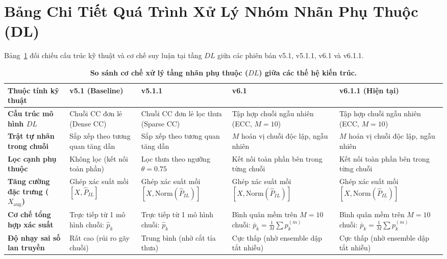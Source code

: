 \documentclass[11pt,a4paper]{article}
\begin{document}
\section{Bảng Chi Tiết Quá Trình Xử Lý Nhóm Nhãn Phụ Thuộc (DL)}

Bảng~\ref{tab:dl_processing_comparison} đối chiếu cấu trúc kỹ thuật và cơ chế suy luận tại tầng $DL$ giữa các phiên bản v5.1, v5.1.1, v6.1 và v6.1.1.

\begin{table}[H]
\centering
\small
\caption{\textbf{So sánh cơ chế xử lý tầng nhãn phụ thuộc ($DL$) giữa các thế hệ kiến trúc.}}
\label{tab:dl_processing_comparison}
\begin{tabular}{p{3.2cm} p{3.2cm} p{3.2cm} p{3.2cm} p{3.2cm}}
\toprule
\textbf{Thuộc tính kỹ thuật} & \textbf{v5.1 (Baseline)} & \textbf{v5.1.1} & \textbf{v6.1} & \textbf{v6.1.1 (Hiện tại)} \\
\midrule
\textbf{Cấu trúc mô hình $DL$} & Chuỗi CC đơn lẻ (Dense CC) & Chuỗi CC đơn lẻ lọc thưa (Sparse CC) & Tập hợp chuỗi ngẫu nhiên (ECC, $M=10$) & Tập hợp chuỗi ngẫu nhiên (ECC, $M=10$) \\
\addlinespace
\textbf{Trật tự nhãn trong chuỗi} & Sắp xếp theo tương quan tăng dần & Sắp xếp theo tương quan tăng dần & $M$ hoán vị chuỗi độc lập, ngẫu nhiên & $M$ hoán vị chuỗi độc lập, ngẫu nhiên \\
\addlinespace
\textbf{Lọc cạnh phụ thuộc} & Không lọc (kết nối toàn phần) & Lọc thưa theo ngưỡng $\theta = 0.75$ & Kết nối toàn phần bên trong từng chuỗi & Kết nối toàn phần bên trong từng chuỗi \\
\addlinespace
\textbf{Tăng cường đặc trưng ($X_{\text{aug}}$)} & Ghép xác suất mồi $[X, \hat{P}_{IL}]$ & Ghép xác suất mồi $[X, \text{Norm}(\hat{P}_{IL})]$ & Ghép xác suất mồi $[X, \text{Norm}(\hat{P}_{IL})]$ & Ghép xác suất mồi $[X, \text{Norm}(\hat{P}_{IL})]$ \\
\addlinespace
\textbf{Cơ chế tổng hợp xác suất} & Trực tiếp từ 1 mô hình chuỗi: $\hat{p}_k$ & Trực tiếp từ 1 mô hình chuỗi: $\hat{p}_k$ & Bình quân mềm trên $M=10$ chuỗi: $\bar{p}_k = \frac{1}{M}\sum p_k^{(m)}$ & Bình quân mềm trên $M=10$ chuỗi: $\bar{p}_k = \frac{1}{M}\sum p_k^{(m)}$ \\
\addlinespace
\textbf{Độ nhạy sai số lan truyền} & Rất cao (rủi ro gãy chuỗi) & Trung bình (nhờ cắt tỉa thưa) & Cực thấp (nhờ ensemble dập tắt nhiễu) & Cực thấp (nhờ ensemble dập tắt nhiễu) \\
\bottomrule
\end{tabular}
\end{table}
\end{document}
